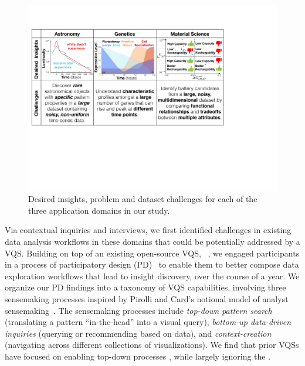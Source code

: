  \begin{figure}[ht!]
 	\centering
 	\includegraphics[width=\linewidth]{figures/science_goal.pdf}
 	\caption{Desired insights, problem and dataset challenges for each of the three application domains in our study.}
 	\label{science_goal}
 	\vspace*{-5pt}
 \end{figure}
 \par Via contextual inquiries and interviews, we first identified challenges in existing data analysis workflows in these domains
 that could be potentially addressed by a VQS. Building on top of an existing open-source VQS, \zv~\cite{Siddiqui2017,Siddiqui2017VLDB}, we engaged participants in a process of participatory design (PD)~\cite{Muller1993,BodkerGronbaek,HoltzblattJones} to enable them to better compose data exploration workflows that lead to insight discovery, over the course of a year.  We organize our PD findings into a taxonomy of VQS capabilities, involving three sensemaking processes inspired by Pirolli and Card's notional model of analyst sensemaking~\cite{Pirolli}. The sensemaking processes include \emph{top-down pattern search} (translating a pattern ``in-the-head'' into a visual query), \emph{bottom-up data-driven inquiries} (querying or recommending based on data), and \emph{context-creation} (navigating across different collections of visualizations). We find that prior VQSs have focused on enabling top-down processes , while largely ignoring the .
